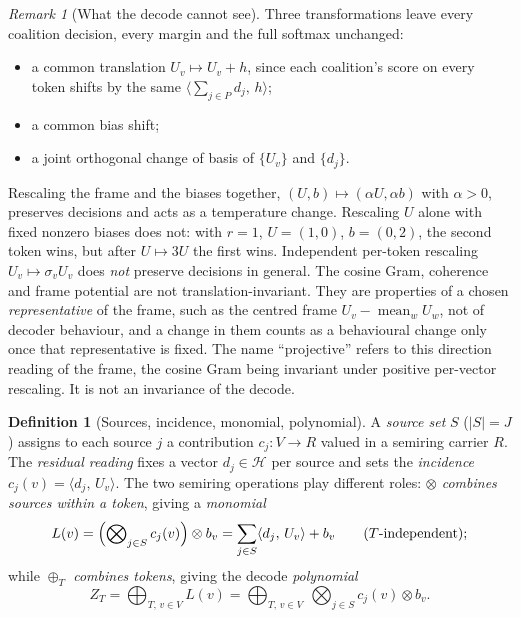 \documentclass[11pt]{article}
\theoremstyle{definition}
\newtheorem{definition}{Definition}[section]
\theoremstyle{plain}
\theoremstyle{remark}
\newtheorem{remark}[theorem]{Remark}
\newcommand{\HH}{\mathcal{H}}
\newcommand{\inner}[2]{\langle #1,\, #2\rangle}
\begin{document}
\begin{remark}[What the decode cannot see]\label{rem:gauge}
Three transformations leave every coalition decision, every margin and the full softmax unchanged:
\begin{itemize}[nosep]
  \item a common translation $U_v\mapsto U_v+h$, since each coalition's score on every token shifts by
        the same $\inner{\sum_{j\in P}d_j}{h}$;
  \item a common bias shift;
  \item a joint orthogonal change of basis of $\{U_v\}$ and $\{d_j\}$.
\end{itemize}
Rescaling the frame and the biases together, $(U,b)\mapsto(\alpha U,\alpha b)$ with $\alpha>0$, preserves
decisions and acts as a temperature change. Rescaling $U$ alone with fixed nonzero biases does not: with
$r=1$, $U=(1,0)$, $b=(0,2)$, the second token wins, but after $U\mapsto3U$ the first wins. Independent per-token
rescaling $U_v\mapsto\sigma_vU_v$ does \emph{not} preserve decisions in general. The cosine Gram, coherence
and frame potential are not translation-invariant. They are properties of a chosen \emph{representative}
of the frame, such as the centred frame $U_v-\operatorname{mean}_wU_w$, not of decoder behaviour, and a
change in them counts as a behavioural change only once that representative is fixed. The name
``projective'' refers to this direction reading of the frame, the cosine Gram being invariant under
positive per-vector rescaling. It is not an invariance of the decode.
\end{remark}

\begin{definition}[Sources, incidence, monomial, polynomial]\label{def:agg}
A \emph{source set} $S$ ($|S|=J$) assigns to each source $j$ a contribution $c_j:V\to R$ valued in a
semiring carrier $R$. The \emph{residual reading} fixes a vector $d_j\in\HH$ per source and sets the
\emph{incidence} $c_j(v)=\inner{d_j}{U_v}$. The two semiring operations play different roles:
\emph{$\otimes$ combines sources within a token}, giving a \emph{monomial}
\[
  L(v)=\Bigl(\bigotimes\nolimits_{j\in S} c_j(v)\Bigr)\otimes b_v=\sum_{j\in S}\inner{d_j}{U_v}+b_v
  \qquad(\text{$T$-independent});
\]
while \emph{$\oplus_T$ combines tokens}, giving the decode \emph{polynomial}
\[
  Z_T=\bigoplus\nolimits_{T,\,v\in V} L(v)
      =\bigoplus\nolimits_{T,\,v\in V}\ \bigotimes\nolimits_{j\in S} c_j(v)\otimes b_v .
\]
\end{definition}
\end{document}
